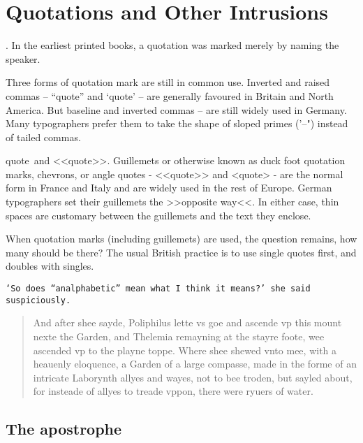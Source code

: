 \chapter{Quotations and Other Intrusions}

. In the earliest printed books, a quotation was marked merely by naming the speaker.

Three forms of quotation mark are still in common use. Inverted and raised commas -- ``quote'' and
`quote' -- are generally favoured in Britain and North America. But baseline and inverted commas --
are still widely used in Germany. Many typographers prefer them to take the shape of
sloped primes ('--") instead of tailed commas. 

\DescribeMacro{\guillemotleft}
\DescribeMacro{\guillemotright}
\guillemotleft quote\guillemotright\ and <<quote>>. Guillemets or otherwise known as duck foot quotation marks, chevrons, or angle quotes - <<quote>> and <quote> - are the normal form in France and Italy and are widely used in the rest of Europe. German typographers set their guillemets the 
>>opposite way<<. In either case, thin spaces are customary between the guillemets and the text they enclose.

When quotation marks (including guillemets) are used, the question remains, how many should be there?
The usual British practice is to use single quotes first, and doubles with singles.


\texttt{`So does ``analphabetic'' mean what I think it means?' she said suspiciously.}

\begin{quotation}
And after shee sayde, Poliphilus lette vs goe and ascende vp this mount nexte the Garden, and Thelemia remayning at the stayre foote, wee ascended vp to the playne toppe. Where shee shewed vnto mee, with a heauenly eloquence, a Garden of a large compasse, made in the forme of an intricate Laborynth allyes and wayes, not to bee troden, but sayled about, for insteade of allyes to treade vppon, there were ryuers of water.
\end{quotation}

\section{The apostrophe}

